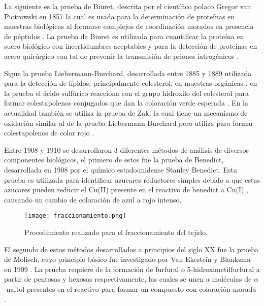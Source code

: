 \documentclass[fleqn,10pt]{SelfArx}
\begin{document}
	\newpage
	La siguiente es la prueba de Biuret, descrita por el científico polaco Gregor van Piotrowski en 1857 \cite{von1857neue} la cual es usada para la determinación de proteínas en muestras biológicas al formarse complejos de coordinación morados en presencia de péptidos \cite{rose1833ueber}. La prueba de Biuret es utilizada para cuantificar la proteína en suero biológico con incertidumbres aceptables \cite{zheng2017measurement} y para la detección de proteínas en acero quirúrgico con tal de prevenir la transmisión de priones iatrogénicos \cite{lipscomb2006sensitivity}.
	
	Sigue la prueba Liebermann-Burchard, desarrollada entre 1885 y 1889 \cite{xiong2007liebermann} utilizada para la detección de lípidos, principalmente colesterol, en muestras orgánicas \cite{barreto2005lipid}. en la prueba el ácido sulfúrico reacciona con el grupo hidroxilo del colesterol para formar colestapolenos conjugados que dan la coloración verde esperada \cite{xiong2007liebermann, burke1974mechanisms}. En la actualidad también se utiliza la prueba de Zak, la cual tiene un mecanismo de oxidación similar al de la prueba Liebermann-Burchard pero utiliza  para formar colestapolenos de color rojo \cite{burke1974mechanisms}.
	
	Entre 1908 y 1910 se desarrollaron 3 diferentes métodos de análisis de diversos componentes biológicos, el primero de estos fue la prueba de Benedict, desarrollada en 1908\cite{benedict1909reagent} por el químico estadounidense Stanley Benedict. Esta prueba es utilizada para identificar azucares reductores simples debido a que estas azucares pueden reducir el Cu(II) presente en el reactivo de benedict a Cu(I) \cite{daniels1960fehling}, causando un cambio de coloración de azul a rojo intenso. 

	\begin{figure*}[h]
		\centering
		\texttt{[image: fraccionamiento.png]}
		\caption{Procedimiento realizado para el fraccionamiento del tejido.}
		\label{fig: fraccionamiento}
	\end{figure*}

	El segundo de estos métodos desarrollados a principios del siglo XX fue la prueba de Molisch, cuyo principio básico fue investigado por Van Ekestein y Blanksma en 1909 \cite{van1910omega}. La prueba requiere de la formación de furfural o 5-hidroximetilfurfural a partir de pentosas y hexosas respectivamente, las cuales se unen a moléculas de $\alpha$-naftol presentes en el reactivo para formar un compuesto con coloración morada \cite{devor1950carbohydrate}. 
	
\end{document}
